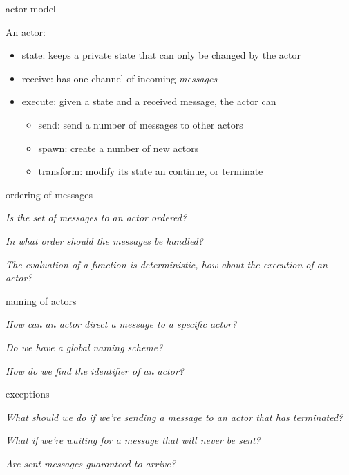 \begin{frame}{actor model}

An actor:
\begin{itemize}
\item state: keeps a private state that can only be changed by the actor
\pause
\item receive: has one channel of incoming {\em messages}
\pause
\item execute: given a state and a received message, the actor can
\begin{itemize}
\pause
\item send: send a number of messages to other actors
\pause
\item spawn: create a number of new actors
\pause
\item transform: modify its state an continue, or terminate
\end{itemize}
\end{itemize}

\end{frame}


\begin{frame}{ordering of messages}

{\em Is the set of messages to an actor ordered?}

\pause\vspace{20pt}
{\em In what order should the messages be handled?}

\pause\vspace{20pt}
{\em The evaluation of a function is deterministic, how about the execution of an actor?}


\end{frame}

\begin{frame}{naming of actors}

{\em How can an actor direct a message to a specific actor?}

\pause\vspace{20pt}
{\em Do we have a global naming scheme?}

\pause\vspace{20pt}
{\em How do we find the identifier of an actor?}
     
\end{frame}



\begin{frame}{exceptions}

{\em What should we do if we're sending a message to an actor that has terminated?}

\pause\vspace{20pt}
{\em What if we're waiting for a message that will never be sent?}

\pause\vspace{20pt}
{\em Are sent messages guaranteed to arrive?}

\end{frame}


